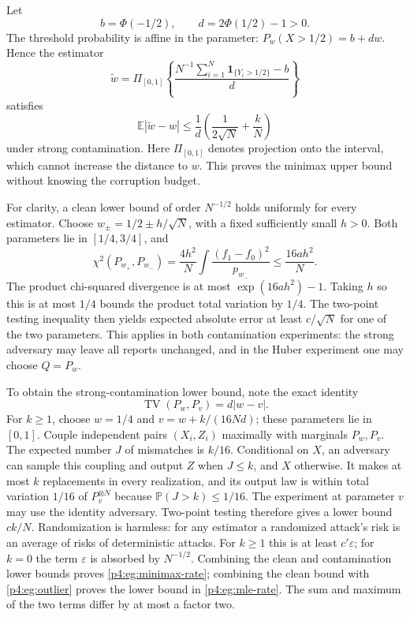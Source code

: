 \documentclass[11pt,a4paper]{article}
\theoremstyle{definition}
\theoremstyle{remark}
\numberwithin{equation}{section}
\begin{document}
Let
\[
 b=\Phi(-1/2),\qquad d=2\Phi(1/2)-1>0.
\]
The threshold probability is affine in the parameter:
$P_w(X>1/2)=b+dw$. Hence the estimator
\begin{equation}\label{p4:eg:threshold}
 \widetilde w=
 \Pi_{[0,1]}\left\{
   \frac{N^{-1}\sum_{i=1}^N\mathbf1_{\{Y_i>1/2\}}-b}{d}
 \right\}
\end{equation}
satisfies
\[
 \mathbb E|\widetilde w-w|
 \le\frac1d\left(\frac1{2\sqrt N}+\frac{k}{N}\right)
\]
under strong contamination. Here $\Pi_{[0,1]}$ denotes projection
onto the interval, which cannot increase the distance to $w$.
This proves the minimax upper bound without knowing the corruption
budget.

For clarity, a clean lower bound of order $N^{-1/2}$ holds uniformly
for every estimator. Choose
$w_\pm=1/2\pm h/\sqrt N$, with a fixed sufficiently small $h>0$.
Both parameters lie in $[1/4,3/4]$, and
\[
 \chi^2(P_{w_+},P_{w_-})
 =\frac{4h^2}{N}
       \int\frac{(f_1-f_0)^2}{p_{w_-}}
 \le\frac{16ah^2}{N}.
\]
The product chi-squared divergence is at most
$\exp(16ah^2)-1$. Taking $h$ so this is at most $1/4$ bounds the
product total variation by $1/4$. The two-point testing inequality
then yields expected absolute error at least $c/\sqrt N$ for one
of the two parameters. This applies in both contamination experiments:
the strong adversary may leave all reports unchanged, and in the
Huber experiment one may choose $Q=P_w$.

To obtain the strong-contamination lower bound, note the exact identity
\begin{equation}\label{p4:eg:tv}
 \operatorname{TV}(P_w,P_v)=d|w-v|.
\end{equation}
For $k\ge1$, choose $w=1/4$ and
$v=w+k/(16Nd)$; these parameters lie in $[0,1]$.
Couple independent pairs $(X_i,Z_i)$ maximally with marginals
$P_w,P_v$. The expected number $J$ of mismatches is $k/16$.
Conditional on $X$, an adversary can sample this coupling and output
$Z$ when $J\le k$, and $X$ otherwise. It makes at most $k$
replacements in every realization, and its output law is within
total variation $1/16$ of $P_v^{\otimes N}$ because
$\mathbb P(J>k)\le1/16$. The experiment at parameter $v$ may use
the identity adversary. Two-point testing therefore gives a lower
bound $c k/N$.
Randomization is harmless: for any estimator a randomized attack's
risk is an average of risks of deterministic attacks.
For $k\ge1$ this is at least $c'\varepsilon$; for $k=0$ the term
$\varepsilon$ is absorbed by $N^{-1/2}$.
Combining the clean and contamination lower bounds proves
\eqref{p4:eg:minimax-rate}; combining the clean bound with
\eqref{p4:eg:outlier} proves the lower bound in \eqref{p4:eg:mle-rate}.
The sum and maximum of the two terms differ by at most a factor two.
\end{document}
